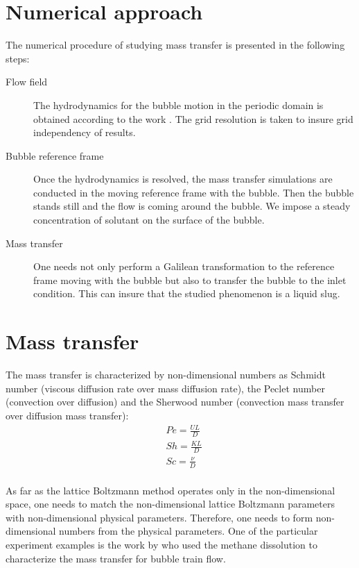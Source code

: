 \documentclass{article}
\begin{document}
\section{Numerical approach}
\label{sec:numerics}
The numerical  procedure of studying mass transfer is presented in the following steps:
\begin{description}
 \item[Flow field] The hydrodynamics for the bubble motion in the periodic domain is obtained
according to the work \cite{kuzmin-binary2d}. The grid resolution is taken to insure grid
independency of results.  
 \item[Bubble reference frame] Once the hydrodynamics is resolved, the mass transfer simulations
are conducted in the moving
reference frame with the bubble. Then the bubble stands still and the flow is coming around the
bubble. We impose a steady concentration of solutant on the surface of the bubble.
\item[Mass transfer] One needs not only perform a Galilean transformation to the reference
frame moving with the bubble but also to
transfer the bubble to the inlet condition. This can insure that the studied phenomenon is a liquid
slug. 
\end{description}






\section{Mass transfer}
The mass transfer is characterized by non-dimensional numbers as Schmidt number (viscous diffusion
rate over mass diffusion rate), the Peclet number (convection over diffusion) and the Sherwood
number (convection mass transfer over diffusion mass transfer):
\begin{equation}
\begin{aligned}
&Pe=\frac{U L}{D}\\
&Sh=\frac{K L}{D}\\
&Sc=\frac{\nu}{D}\\
\end{aligned}
\end{equation}

As far as the lattice Boltzmann method operates only in the non-dimensional space, one needs to
match the non-dimensional lattice Boltzmann parameters with non-dimensional physical parameters.
Therefore, one needs to form non-dimensional numbers from the physical parameters. One of the
particular experiment examples is the
work by \citet{bercic-mass} who used the methane dissolution to characterize the mass transfer for
bubble train flow. 
\end{document}
